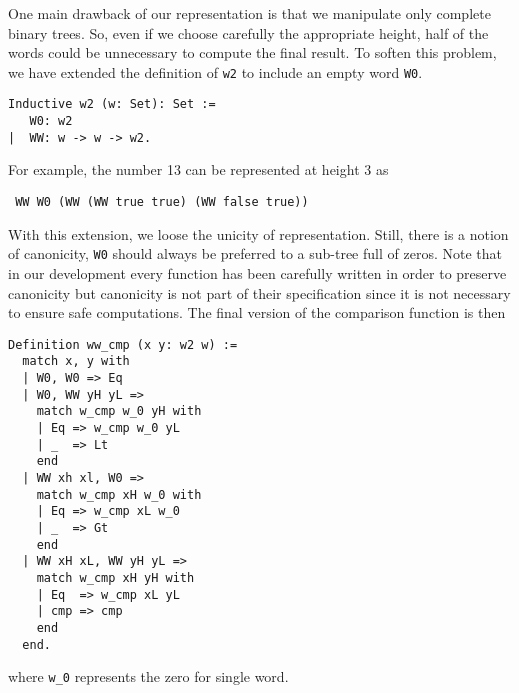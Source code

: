 One main drawback of our representation is that we manipulate only complete binary trees. 
So, even if we choose carefully the appropriate height, half of the words could be unnecessary 
to compute the final result. 
To soften this problem, we have extended the definition of {\tt w2} to include an
empty word {\tt W0}. 
\begin{verbatim}
Inductive w2 (w: Set): Set :=  
   W0: w2
|  WW: w -> w -> w2.
\end{verbatim}
For example, the number 13 can be represented at height 3 as
\begin{verbatim}
 WW W0 (WW (WW true true) (WW false true))
\end{verbatim}
With this extension, we loose the unicity of representation. Still, there is a notion
of canonicity, {\tt W0} should always be preferred to a sub-tree full of zeros. Note that in
our development every function has been carefully written in order to preserve canonicity but
canonicity  is not part of their specification since it is not necessary to ensure safe computations.
The final version of the comparison function is then
\begin{verbatim}
Definition ww_cmp (x y: w2 w) :=
  match x, y with
  | W0, W0 => Eq
  | W0, WW yH yL =>
    match w_cmp w_0 yH with
    | Eq => w_cmp w_0 yL
    | _  => Lt
    end
  | WW xh xl, W0 =>
    match w_cmp xH w_0 with
    | Eq => w_cmp xL w_0
    | _  => Gt
    end
  | WW xH xL, WW yH yL =>
    match w_cmp xH yH with
    | Eq  => w_cmp xL yL
    | cmp => cmp
    end
  end.
\end{verbatim}
where {\tt w\_0} represents the zero for single word.

